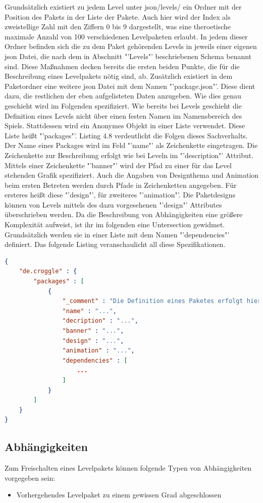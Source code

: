 Grundsätzlich existiert zu jedem Level unter json/levels/ ein Ordner mit der Position des Pakets in der Liste der Pakete.
Auch hier wird der Index als zweistellige Zahl mit den Ziffern 0 bis 9 dargestellt, was eine theroetische maximale Anzahl von 100 verschiedenen Levelpaketen erlaubt.
In jedem dieser Ordner befinden sich die zu dem Paket gehörenden Levels in jeweils einer eigenen json Datei, die nach dem in Abschnitt "'Levels"' beschriebenen Schema benannt sind.
Diese Maßnahmen decken bereits die ersten beiden Punkte, die für die Beschreibung eines Levelpakets nötig sind, ab.
Zusätzlich existiert in dem Paketordner eine weitere json Datei mit dem Namen "'package.json"'.
Diese dient dazu, die restlichen der eben aufgelisteten Daten anzugeben.
Wie dies genau geschieht wird im Folgenden spezifiziert.
\newline
Wie bereits bei Levels geschieht die Definition eines Levels nicht über einen festen Namen im Namensbereich des Spiels.
Stattdessen wird ein Anonymes Objekt in einer Liste verwendet.
Diese Liste heißt "'packages"'.
Listing 4.8 verdeutlicht die Folgen dieses Sachverhalts.
Der Name eines Packages wird im Feld "'name"' als Zeichenkette eingetragen.
Die Zeichenkette zur Beschreibung erfolgt wie bei Leveln im "'description"' Attribut.
Mittels einer Zeichenkette "'banner"' wird der Pfad zu einer für das Level stehenden Grafik spezifiziert.
Auch die Angaben von Designthema und Animation beim ersten Betreten werden durch Pfade in Zeichenketten angegeben.
Für ersteres heißt diese "'design"', für zweiteres "'animation"'.
Die Paketdesigns können von Levels mittels des dazu vorgesehenen "'design"' Attributes überschrieben werden.
Da die Beschreibung von Abhängigkeiten eine größere Komplexität aufweist, ist ihr im folgenden eine Untersection gewidmet.
Grundsätzlich werden sie in einer Liste mit dem Namen "'dependencies"' definiert.
Das folgende Listing veranschaulicht all diese Spezifikationen.
\begin{lstlisting}[language=json,caption={Standardinhalt der Definition eines Levels}]
{
	"de.croggle" : {
		"packages" : [
			{
				"_comment" : "Die Definition eines Paketes erfolgt hier",
				"name" : "...",
				"decription" : "...",
				"banner" : "...",
				"design" : "...",
				"animation" : "...",
				"dependencies" : [
					...
				]
			}
		]
	}
}
\end{lstlisting}

\subsection{Abhängigkeiten}
Zum Freischalten eines Levelpakets können folgende Typen von Abhängigkeiten vorgegeben sein:
\begin{itemize}
	\item Vorhergehendes Levelpaket zu einem gewissen Grad abgeschlossen
\end{itemize}

